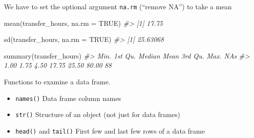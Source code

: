 \documentclass[
]{book}
\newenvironment{Shaded}{\begin{snugshade}}{\end{snugshade}}
\newcommand{\AttributeTok}[1]{\textcolor[rgb]{0.77,0.63,0.00}{#1}}
\newcommand{\CommentTok}[1]{\textcolor[rgb]{0.56,0.35,0.01}{\textit{#1}}}
\newcommand{\ConstantTok}[1]{\textcolor[rgb]{0.00,0.00,0.00}{#1}}
\newcommand{\FunctionTok}[1]{\textcolor[rgb]{0.00,0.00,0.00}{#1}}
\newcommand{\NormalTok}[1]{#1}
\providecommand{\tightlist}{%
  \setlength{\itemsep}{0pt}\setlength{\parskip}{0pt}}
\begin{document}
We have to set the optional argument \texttt{na.rm} (``remove NA'') to take a mean

\begin{Shaded}
\begin{Highlighting}[]
\FunctionTok{mean}\NormalTok{(transfer\_hours, }\AttributeTok{na.rm =} \ConstantTok{TRUE}\NormalTok{)}
\CommentTok{\#\textgreater{} [1] 17.75}

\FunctionTok{sd}\NormalTok{(transfer\_hours, }\AttributeTok{na.rm =} \ConstantTok{TRUE}\NormalTok{)}
\CommentTok{\#\textgreater{} [1] 25.63068}

\FunctionTok{summary}\NormalTok{(transfer\_hours)}
\CommentTok{\#\textgreater{}    Min. 1st Qu.  Median    Mean 3rd Qu.    Max.    NA\textquotesingle{}s }
\CommentTok{\#\textgreater{}    1.00    1.75    4.50   17.75   25.50   80.00      88}
\end{Highlighting}
\end{Shaded}

Functions to examine a data frame.

\begin{itemize}
\tightlist
\item
  \texttt{names()} Data frame column names
\item
  \texttt{str()} Structure of an object (not just for data frames)
\item
  \texttt{head()} and \texttt{tail()} First few and last few rows of a data frame
\end{itemize}
\end{document}
